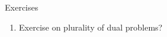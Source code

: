 \begin{xcb}{Exercises}
\begin{enumerate}[label=\thechapter.\arabic*]


\item Exercise on plurality of dual problems?

\end{enumerate}
\end{xcb}